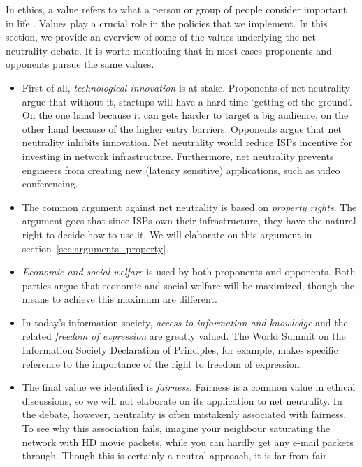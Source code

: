 
In ethics, a value refers to what a person or group of people consider important in life \cite{friedman2006value}. Values play a crucial role in the policies that we implement. In this section, we provide an overview of some of the values underlying the net neutrality debate. It is worth mentioning that in most cases proponents and opponents pursue the same values.

\begin{itemize}
\item First of all, \emph{technological innovation} is at stake. Proponents of net neutrality argue that without it, startups will have a hard time `getting off the ground'. On the one hand because it can gets harder to target a big audience, on the other hand because of the higher entry barriers. Opponents argue that net neutrality inhibits innovation. Net neutrality would reduce \acp{ISP} incentive for investing in network infrastructure. Furthermore, net neutrality prevents engineers from creating new (latency sensitive) applications, such as video conferencing.

\item The common argument against net neutrality is based on \emph{property rights}. The argument goes that since \acp{ISP} own their infrastructure, they have the natural right to decide how to use it. We will elaborate on this argument in section~\ref{sec:arguments_property}.

\item \emph{Economic and social welfare} is used by both proponents and opponents. Both parties argue that economic and social welfare will be maximized, though the means to achieve this maximum are different.

\item In today's information society, \emph{access to information and knowledge} and the related \emph{freedom of expression} are greatly valued. The World Summit on the Information Society Declaration of Principles, for example, makes specific reference to the importance of the right to freedom of expression.

\item The final value we identified is \emph{fairness}. Fairness is a common value in ethical discussions, so we will not elaborate on its application to net neutrality. In the debate, however, neutrality is often mistakenly associated with fairness. To see why this association fails, imagine your neighbour saturating the network with HD movie packets, while you can hardly get any e-mail packets through. Though this is certainly a neutral approach, it is far from fair.
\end{itemize}